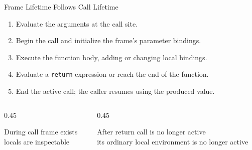 \documentclass[aspectratio=169,10pt]{beamer}
\begin{document}
\begin{frame}{Frame Lifetime Follows Call Lifetime}
  \begin{enumerate}
    \item Evaluate the arguments at the call site.
    \item Begin the call and initialize the frame's parameter bindings.
    \item Execute the function body, adding or changing local bindings.
    \item Evaluate a \texttt{return} expression or reach the end of the function.
    \item End the active call; the caller resumes using the produced value.
  \end{enumerate}

  \begin{columns}[T,onlytextwidth]
    \begin{column}{0.45\textwidth}
      \begin{block}{During call}
        frame exists\\
        locals are inspectable
      \end{block}
    \end{column}

    \begin{column}{0.45\textwidth}
      \begin{block}{After return}
        call is no longer active\\
        its ordinary local environment is no longer active
      \end{block}
    \end{column}
  \end{columns}
\end{frame}
\end{document}
